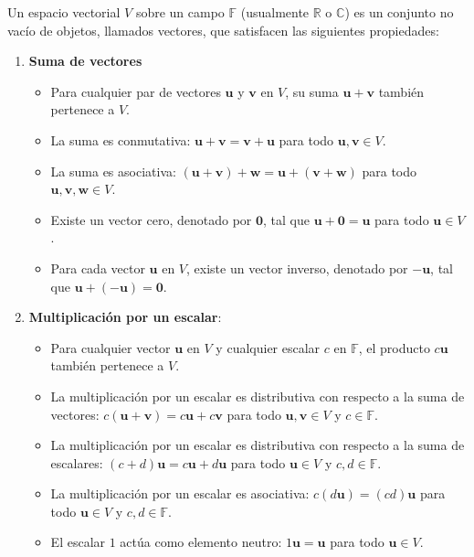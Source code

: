 Un espacio vectorial $V$ sobre un campo $\mathbb{F}$ (usualmente $\mathbb{R}$ o $\mathbb{C}$) es un conjunto no vacío de objetos, llamados vectores, que satisfacen las siguientes propiedades:

\begin{enumerate}
	\item \textbf{Suma de vectores}
	\begin{itemize}
		\item Para cualquier par de vectores $\mathbf{u}$ y $\mathbf{v}$ en $V$, su suma $\mathbf{u} + \mathbf{v}$ también pertenece a $V$.
		\item La suma es conmutativa: $\mathbf{u} + \mathbf{v} = \mathbf{v} + \mathbf{u}$ para todo $\mathbf{u}, \mathbf{v} \in V$.
		\item La suma es asociativa: $(\mathbf{u} + \mathbf{v}) + \mathbf{w} = \mathbf{u} + (\mathbf{v} + \mathbf{w})$ para todo $\mathbf{u}, \mathbf{v}, \mathbf{w} \in V$.
		\item Existe un vector cero, denotado por $\mathbf{0}$, tal que $\mathbf{u} + \mathbf{0} = \mathbf{u}$ para todo $\mathbf{u} \in V$.
		\item Para cada vector $\mathbf{u}$ en $V$, existe un vector inverso, denotado por $-\mathbf{u}$, tal que $\mathbf{u} + (-\mathbf{u}) = \mathbf{0}$.
	\end{itemize}
	
	\item \textbf{Multiplicación por un escalar}:
	\begin{itemize}
		\item Para cualquier vector $\mathbf{u}$ en $V$ y cualquier escalar $c$ en $\mathbb{F}$, el producto $c\mathbf{u}$ también pertenece a $V$.
		\item La multiplicación por un escalar es distributiva con respecto a la suma de vectores: $c(\mathbf{u} + \mathbf{v}) = c\mathbf{u} + c\mathbf{v}$ para todo $\mathbf{u}, \mathbf{v} \in V$ y $c \in \mathbb{F}$.
		\item La multiplicación por un escalar es distributiva con respecto a la suma de escalares: $(c + d)\mathbf{u} = c\mathbf{u} + d\mathbf{u}$ para todo $\mathbf{u} \in V$ y $c, d \in \mathbb{F}$.
		\item La multiplicación por un escalar es asociativa: $c(d\mathbf{u}) = (cd)\mathbf{u}$ para todo $\mathbf{u} \in V$ y $c, d \in \mathbb{F}$.
		\item El escalar $1$ actúa como elemento neutro: $1\mathbf{u} = \mathbf{u}$ para todo $\mathbf{u} \in V$.
	\end{itemize}
\end{enumerate}


